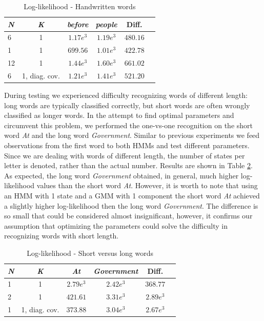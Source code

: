 \documentclass[conference]{IEEEtran}
\begin{document}
\begin{table}[H]
\centering
\caption{Log-likelihood - Handwritten words}
\label{Table:hand}
 \begin{tabular}{|l|c|c|c|c|r|}\hline
 {\it N} 	& {\it K} 		& {\it before} 		& {\it people} 	& 	Diff. 		\\\hline
  6 	& 1 		&  $1.17e^3$ 		& $1.19e^3$ 	& 	$480.16$	\\
  1 	& 1 		&  $699.56$ 		& $1.01e^3$ 	&	$422.78$	\\
  12	& 1		&  $1.44e^3$		& $1.60e^3$ 	&	$661.02$	\\
  6	& 1, diag. cov. & $1.21e^3$		& $1.41e^{3}$	&	$521.20$	\\\hline
 \end{tabular}
\end{table}

During testing we experienced difficulty recognizing words of different length: long words are typically classified correctly, but short words are often wrongly classified as longer words. In the attempt to find optimal parameters and circumvent this problem, we performed the one-vs-one recognition on the short word {\it At}  and the long word {\it Government}. Similar to previous experiments we feed observations from the first word to both HMMs and test different parameters. Since we are dealing with words of different length, the number of states per letter is denoted, rather than the actual number. Results are shown in Table \ref{Table:shortVSlong}. As expected, the long word {\it Government} obtained, in general, much higher log-likelihood values than the short word {\it At}. However, it is worth to note that using an HMM with 1 state and a GMM with 1 component the short word {\it At} achieved a slightly higher log-likelihood then the long word {\it Government}. The difference is so small that could be considered almost insignificant, however, it confirms our assumption that optimizing the parameters could solve the difficulty in recognizing words with short length.

\begin{table}[H]
\centering
\caption{Log-likelihood - Short versus long words}
\label{Table:shortVSlong}
 \begin{tabular}{|l|c|c|c|c|r|}\hline
  {\it N} 	& {\it K} 			& {\it At} 	& {\it Government} 	& Diff. 	\\\hline
  1		& 1			& $2.79e^3$	&  $2.42e^3$ 		& $368.77$	\\
  2		& 1			& $421.61$	& $3.31e^{3}$		& $2.89e^{3}$	\\
  1		& 1, diag. cov.		& $373.88$	& $3.04e^3$		& $2.67e^{3}$	\\\hline
 \end{tabular}
\end{table}
\end{document}
